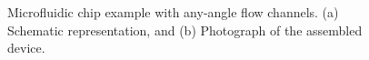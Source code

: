 \documentclass[journal]{IEEEtran}
\begin{document}
\begin{figure}[htbp]
{\begin{minipage}[b]{0.9\columnwidth}
\label{fig:aaexample:b}
\end{minipage}%
}%
\caption{Microfluidic chip example with any-angle flow channels. (a) Schematic representation, and (b) Photograph of the assembled device. }
\label{fig:aaexample}
\end{figure}
\end{document}
